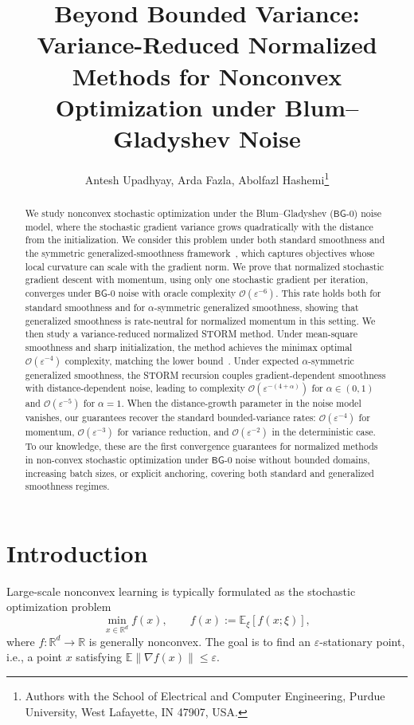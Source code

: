 \documentclass[letter,11pt]{article}
\title{\vspace{-10mm}\textbf{Beyond Bounded Variance: Variance-Reduced Normalized Methods for Nonconvex Optimization under Blum--Gladyshev Noise}}
\date{}
\author{
Antesh Upadhyay, Arda Fazla, Abolfazl Hashemi\thanks{Authors with the School of Electrical and Computer Engineering, Purdue University, West Lafayette, IN 47907, USA.}}
\newcommand{\E}{\mathbb{E}}
\newcommand{\Ocal}{\mathcal{O}}
\begin{document}
\maketitle
\begin{abstract}
We study nonconvex stochastic optimization under the Blum--Gladyshev ($\mathsf{BG}$-0) noise model, where the stochastic gradient variance grows quadratically with the distance from the initialization. We consider this problem under both standard smoothness and the symmetric generalized-smoothness framework~\cite{chen2023generalized}, which captures objectives whose local curvature can scale with the gradient norm. We prove that normalized stochastic gradient descent with momentum, using only one stochastic gradient per iteration, converges under $\mathsf{BG}$-0 noise with oracle complexity $\Ocal(\varepsilon^{-6})$. This rate holds both for standard smoothness and for $\alpha$-symmetric generalized smoothness, showing that generalized smoothness is rate-neutral for normalized momentum in this setting. We then study a variance-reduced normalized STORM method. Under mean-square smoothness and sharp initialization, the method achieves the minimax optimal $\Ocal(\varepsilon^{-4})$ complexity, matching the lower bound~\cite{fazla2026lower}. Under expected $\alpha$-symmetric generalized smoothness, the STORM recursion couples gradient-dependent smoothness with distance-dependent noise, leading to complexity $\Ocal(\varepsilon^{-(4+\alpha)})$ for $\alpha\in(0,1)$ and $\Ocal(\varepsilon^{-5})$ for $\alpha=1$. When the distance-growth parameter in the noise model vanishes, our guarantees recover the standard bounded-variance rates: $\Ocal(\varepsilon^{-4})$ for momentum, $\Ocal(\varepsilon^{-3})$ for variance reduction, and $\Ocal(\varepsilon^{-2})$ in the deterministic case. To our knowledge, these are the first convergence guarantees for normalized methods in non-convex stochastic optimization under $\mathsf{BG}$-0 noise without bounded domains, increasing batch sizes, or explicit anchoring, covering both standard and generalized smoothness regimes.
\end{abstract}
\section{Introduction}
\label{sec:intro}
Large-scale nonconvex learning is typically formulated as the stochastic optimization problem
\begin{equation}
    \label{eq:op_problm}
    \min_{x\in\mathbb R^d} f(x),
    \qquad
    f(x):=\mathbb E_\xi[f(x;\xi)],
\end{equation}
where \(f:\mathbb R^d\to\mathbb R\) is generally nonconvex. The goal is to find an \(\varepsilon\)-stationary point, i.e., a point \(x\) satisfying \(\E\|\nabla f(x)\|\le \varepsilon\).
\end{document}
